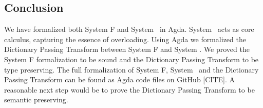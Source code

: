 \subsection{Conclusion}
We have formalized both System F and System \Fo\ in Agda. 
System \Fo\ acts as core calculus, capturing the essence of overloading.
Using Agda we formalized the Dictionary Passing Transform between System F and System \Fo. 
We proved the System F formalization to be sound and the Dictionary Passing Transform to be type preserving. The full formalization of System F, System \Fo\ and the Dictionary Passing Transform can be found as Agda code files on GitHub [CITE].
A reasonable next step would be to prove the Dictionary Passing Transform to be semantic preserving. 